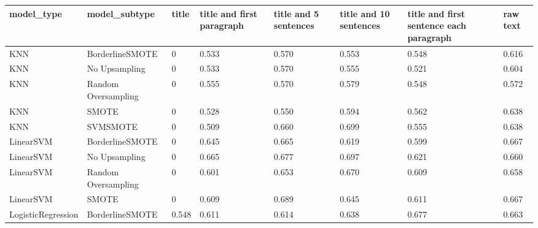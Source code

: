 \begin{tabular}{llllllll}
\toprule
                  model\_type &       model\_subtype & title & title and first paragraph & title and 5 sentences & title and 10 sentences & title and first sentence each paragraph & raw text \\
\midrule
                         KNN &     BorderlineSMOTE &     0 &                     0.533 &                 0.570 &                  0.553 &                                   0.548 &    0.616 \\
                         KNN &       No Upsampling &     0 &                     0.533 &                 0.570 &                  0.555 &                                   0.521 &    0.604 \\
                         KNN & Random Oversampling &     0 &                     0.555 &                 0.570 &                  0.579 &                                   0.548 &    0.572 \\
                         KNN &               SMOTE &     0 &                     0.528 &                 0.550 &                  0.594 &                                   0.562 &    0.638 \\
                         KNN &            SVMSMOTE &     0 &                     0.509 &                 0.660 &                  0.699 &                                   0.555 &    0.638 \\
                   LinearSVM &     BorderlineSMOTE &     0 &                     0.645 &                 0.665 &                  0.619 &                                   0.599 &    0.667 \\
                   LinearSVM &       No Upsampling &     0 &                     0.665 &                 0.677 &                  0.697 &                                   0.621 &    0.660 \\
                   LinearSVM & Random Oversampling &     0 &                     0.601 &                 0.653 &                  0.670 &                                   0.609 &    0.658 \\
                   LinearSVM &               SMOTE &     0 &                     0.609 &                 0.689 &                  0.645 &                                   0.611 &    0.667 \\
          LogisticRegression &     BorderlineSMOTE & 0.548 &                     0.611 &                 0.614 &                  0.638 &                                   0.677 &    0.663 \\

\end{tabular}
